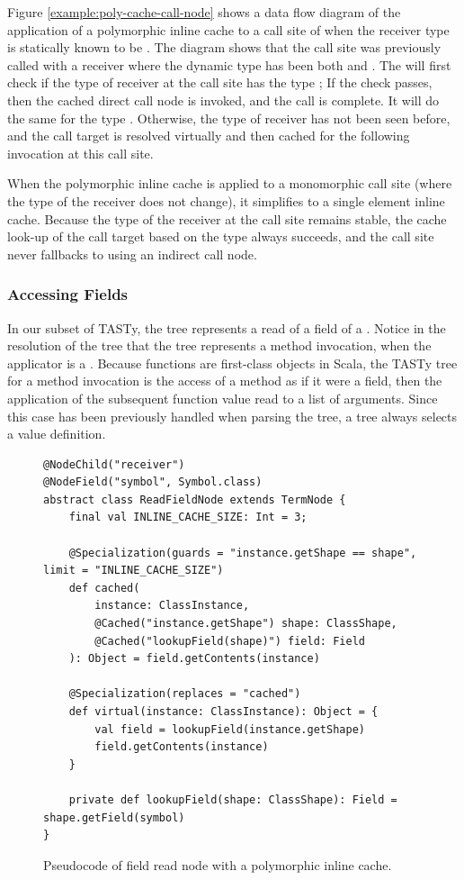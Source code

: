 Figure \ref{example:poly-cache-call-node} shows a data flow diagram of the application of a polymorphic inline cache to a call site of  when the receiver type is statically known to be . 
The diagram shows that the call site was previously called with a receiver where the dynamic type has been both  and .
The  will first check if the type of receiver at the call site has the type ; If the check passes, then the cached direct call node is invoked, and the call is complete.
It will do the same for the type .
Otherwise, the type of receiver has not been seen before, and the call target is resolved virtually and then cached for the following invocation at this call site.

When the polymorphic inline cache is applied to a monomorphic call site (where the type of the receiver does not change), it simplifies to a single element inline cache\cite{smalltalk:inline-caches}. 
Because the type of the receiver at the call site remains stable, the cache look-up of the call target based on the type always succeeds, and the call site never fallbacks to using an indirect call node.

\subsubsection*{Accessing Fields}

In our subset of TASTy, the  tree represents a read of a field of a .
Notice in the resolution of the  tree that the  tree represents a method invocation, when the applicator is a .
Because functions are first-class objects in Scala, the TASTy tree for a method invocation is the access of a method as if it were a field, then the application of the subsequent function value read to a list of arguments.
Since this case has been previously handled when parsing the  tree, a  tree always selects a value definition.

\begin{figure}[!htb]
\begin{verbatim}
@NodeChild("receiver")
@NodeField("symbol", Symbol.class)
abstract class ReadFieldNode extends TermNode {
	final val INLINE_CACHE_SIZE: Int = 3;
		
	@Specialization(guards = "instance.getShape == shape", limit = "INLINE_CACHE_SIZE")
	def cached(
		instance: ClassInstance,
		@Cached("instance.getShape") shape: ClassShape,
		@Cached("lookupField(shape)") field: Field
	): Object = field.getContents(instance)
		
	@Specialization(replaces = "cached")
	def virtual(instance: ClassInstance): Object = {
		val field = lookupField(instance.getShape)
		field.getContents(instance)
	}

	private def lookupField(shape: ClassShape): Field = shape.getField(symbol)
}
\end{verbatim}
\caption{Pseudocode of field read node with a polymorphic inline cache.}
\label{impl:field-read-node}
\end{figure}

